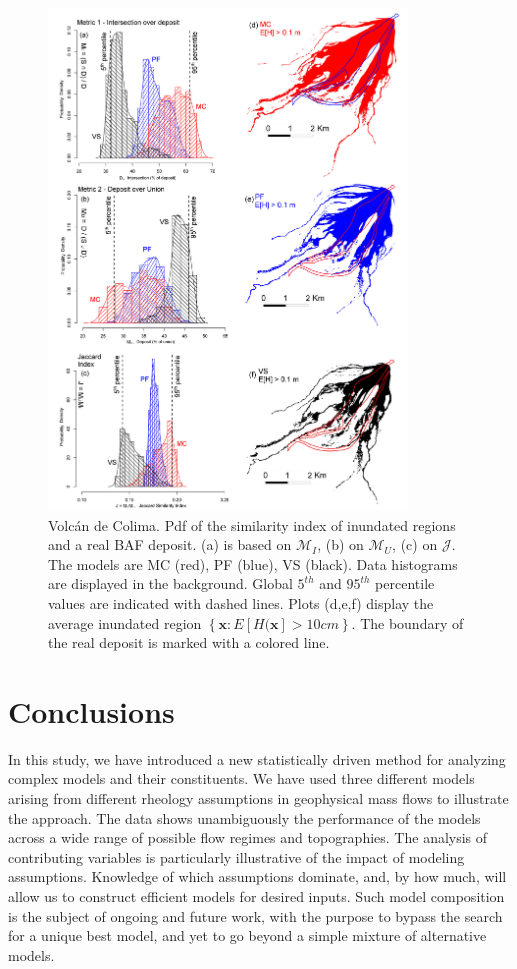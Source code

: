 \documentclass{article}
\begin{document}
\begin{figure}[H]
         \centering
        \includegraphics[width=0.85\textwidth]{figures/Colima/Histograms.jpg}
        \caption{Volc{\'a}n de Colima. Pdf of the similarity index of inundated regions and a real BAF deposit. (a) is based on $\mathcal M_I$, (b) on $\mathcal M_U$, (c) on $\mathcal J$. The models are MC (red), PF (blue), VS (black). Data histograms are displayed in the background. Global $5^{th}$ and $95^{th}$ percentile values are indicated with dashed lines. Plots (d,e,f) display the average inundated region $\left\{\textbf{x} : E[H(\textbf{x}]>10 cm\right\}$. The boundary of the real deposit is marked with a colored line.}\label{fig:Colima-Hist}
\end{figure}

\section{Conclusions}
In this study, we have introduced a new statistically driven method for analyzing complex models and their constituents. We have used three different models arising from different rheology assumptions in geophysical mass flows to illustrate the approach. The data shows unambiguously the performance of the models across a wide range of possible flow regimes and topographies. The analysis of contributing variables is particularly illustrative of the impact of modeling assumptions. Knowledge of which assumptions dominate, and, by how much, will allow us to construct efficient models for desired inputs. Such model composition is the subject of ongoing and future work, with the purpose to bypass the search for a unique best model, and yet to go beyond a simple mixture of alternative models.
\end{document}
